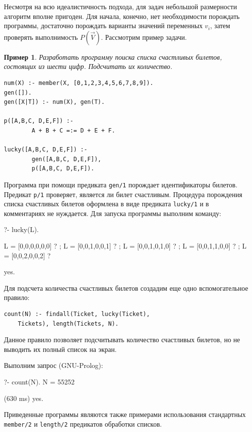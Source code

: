 \documentclass[a4paper,14pt, openany, twoside, final]{extbook} %
\newtheorem{example}{Пример}[chapter]
\begin{document}
Несмотря на всю идеалистичность подхода, для задач небольшой размерности алгоритм вполне пригоден. Для начала, конечно, нет необходимости порождать программы, достаточно порождать варианты значений переменных $v_i$, затем проверять выполнимость $P(\vec{V})$. Рассмотрим пример задачи.

\begin{example}
Разработать программу поиска списка счастливых билетов, состоящих из шести цифр. Подсчитать их количество.
\end{example}

\begin{verbatim}
num(X) :- member(X, [0,1,2,3,4,5,6,7,8,9]).
gen([]).
gen([X|T]) :- num(X), gen(T).

p([A,B,C, D,E,F]) :-
        A + B + C =:= D + E + F.

lucky([A,B,C, D,E,F]) :-
        gen([A,B,C, D,E,F]),
        p([A,B,C, D,E,F]).
\end{verbatim}

Программа при помощи предиката \texttt{gen/1} порождает идентификаторы билетов. Предикат \texttt{p/1} проверяет, является ли билет счастливым. Процедура порождения списка счастливых билетов оформлена в виде предиката \texttt{lucky/1} и в комментариях не нуждается. Для запуска программы выполним команду:

\begin{proexp}
?- lucky(L).

L = [0,0,0,0,0,0] ? ;
L = [0,0,1,0,0,1] ? ;
L = [0,0,1,0,1,0] ? ;
L = [0,0,1,1,0,0] ? ;
L = [0,0,2,0,0,2] ?

yes.
\end{proexp}

\noindent{}Для подсчета количества счастливых билетов создадим еще одно вспомогательное правило:

\begin{verbatim}
count(N) :- findall(Ticket, lucky(Ticket),
    Tickets), length(Tickets, N).
\end{verbatim}

\noindent{}Данное правило позволяет подсчитывать количество счастливых билетов, но не выводить их полный список на экран.

Выполним запрос (GNU-Prolog):

\begin{proexp}
?- count(N).
N = 55252

(630 ms) yes.
\end{proexp}

Приведенные программы являются также примерами использования стандартных \texttt{member/2} и \texttt{length/2} предикатов обработки списков.
\end{document}

